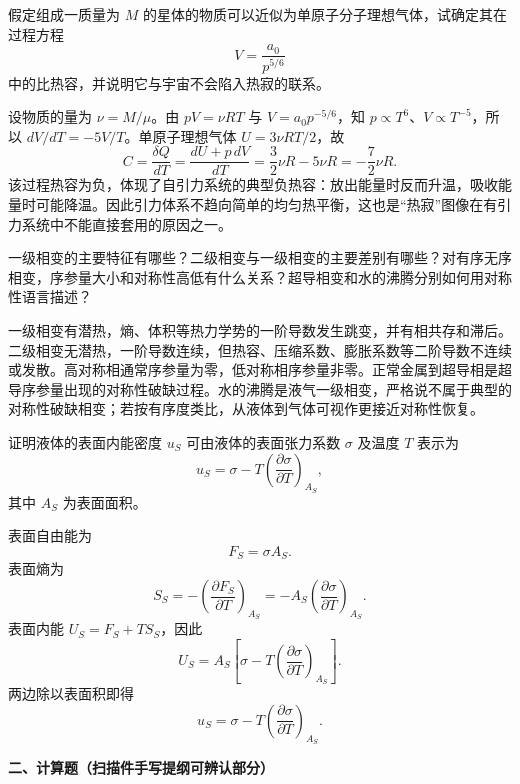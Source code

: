 \begin{question}
假定组成一质量为 $M$ 的星体的物质可以近似为单原子分子理想气体，试确定其在过程方程
\[
V=\frac{a_0}{p^{5/6}}
\]
中的比热容，并说明它与宇宙不会陷入热寂的联系。
\begin{solution}
设物质的量为 $\nu=M/\mu$。由 $pV=\nu RT$ 与 $V=a_0p^{-5/6}$，知 $p\propto T^6$、$V\propto T^{-5}$，所以 $dV/dT=-5V/T$。单原子理想气体 $U=3\nu RT/2$，故
\[
C=\frac{\delta Q}{dT}=\frac{dU+p\,dV}{dT}
=\frac32\nu R-5\nu R=-\frac72\nu R.
\]
该过程热容为负，体现了自引力系统的典型负热容：放出能量时反而升温，吸收能量时可能降温。因此引力体系不趋向简单的均匀热平衡，这也是“热寂”图像在有引力系统中不能直接套用的原因之一。

\end{solution}
\end{question}

\begin{question}
一级相变的主要特征有哪些？二级相变与一级相变的主要差别有哪些？对有序无序相变，序参量大小和对称性高低有什么关系？超导相变和水的沸腾分别如何用对称性语言描述？
\begin{solution}
一级相变有潜热，熵、体积等热力学势的一阶导数发生跳变，并有相共存和滞后。二级相变无潜热，一阶导数连续，但热容、压缩系数、膨胀系数等二阶导数不连续或发散。高对称相通常序参量为零，低对称相序参量非零。正常金属到超导相是超导序参量出现的对称性破缺过程。水的沸腾是液气一级相变，严格说不属于典型的对称性破缺相变；若按有序度类比，从液体到气体可视作更接近对称性恢复。
\end{solution}
\end{question}

\begin{question}
证明液体的表面内能密度 $u_S$ 可由液体的表面张力系数 $\sigma$ 及温度 $T$ 表示为
\[
u_S=\sigma-T\left(\frac{\partial\sigma}{\partial T}\right)_{A_S},
\]
其中 $A_S$ 为表面面积。
\begin{solution}
表面自由能为
\[
F_S=\sigma A_S.
\]
表面熵为
\[
S_S=-\left(\frac{\partial F_S}{\partial T}\right)_{A_S}
=-A_S\left(\frac{\partial\sigma}{\partial T}\right)_{A_S}.
\]
表面内能 $U_S=F_S+TS_S$，因此
\[
U_S=A_S\left[\sigma-T\left(\frac{\partial\sigma}{\partial T}\right)_{A_S}\right].
\]
两边除以表面积即得
\[
u_S=\sigma-T\left(\frac{\partial\sigma}{\partial T}\right)_{A_S}.
\]
\end{solution}
\end{question}

\textbf{二、计算题（扫描件手写提纲可辨认部分）}

